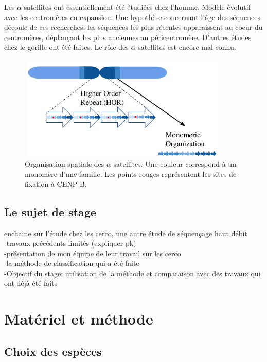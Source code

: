 \documentclass[12pt,a4paper]{article}
\begin{document}
Les $\alpha$-satellites ont essentiellement été étudiées chez l'homme. Modèle évolutif avec les centromères en expansion. Une hypothèse concernant l'âge des séquences découle de ces recherches: les séquences les plus récentes apparaissent au coeur du centromères, déplançant les plus anciennes au péricentromère. D'autres études chez le gorille ont été faites. Le rôle des $\alpha$-satellites est encore mal connu. 

\begin{figure}
\center
\includegraphics[height=5cm, width=10cm]{img/organization.png}
\caption{Organisation spatiale des $\alpha$-satellites. Une couleur correspond à un monomère d'une famille. Les points rouges représentent les sites de fixation à CENP-B.}
\end{figure}


\subsection{Le sujet de stage}
enchaîne sur l'étude chez les cerco, une autre étude de séquençage haut débit\\

-travaux précédents limités (expliquer pk)\\
-présentation de mon équipe de leur travail sur les cerco\\
-la méthode de classification qui a été faite\\
-Objectif du stage: utilisation de la méthode et comparaison avec des travaux qui ont déjà été faits\\



\section{Matériel et méthode}
\subsection{Choix des espèces}
\end{document}
